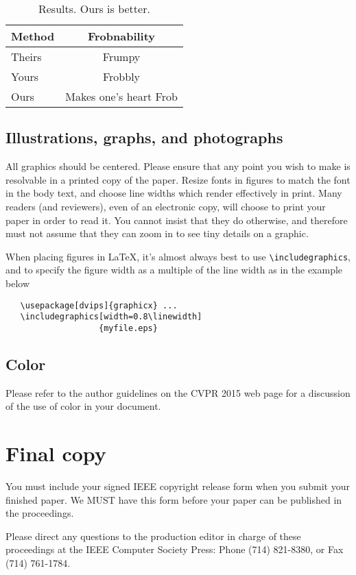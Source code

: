 \begin{table}
\begin{center}
\begin{tabular}{|l|c|}
\hline
Method & Frobnability \\
\hline\hline
Theirs & Frumpy \\
Yours & Frobbly \\
Ours & Makes one's heart Frob\\
\hline
\end{tabular}
\end{center}
\caption{Results.   Ours is better.}
\end{table}

\subsection{Illustrations, graphs, and photographs}

All graphics should be centered.  Please ensure that any point you wish to
make is resolvable in a printed copy of the paper.  Resize fonts in figures
to match the font in the body text, and choose line widths which render
effectively in print.  Many readers (and reviewers), even of an electronic
copy, will choose to print your paper in order to read it.  You cannot
insist that they do otherwise, and therefore must not assume that they can
zoom in to see tiny details on a graphic.

When placing figures in \LaTeX, it's almost always best to use
\verb+\includegraphics+, and to specify the  figure width as a multiple of
the line width as in the example below
{\small\begin{verbatim}
   \usepackage[dvips]{graphicx} ...
   \includegraphics[width=0.8\linewidth]
                   {myfile.eps}
\end{verbatim}
}


\subsection{Color}

Please refer to the author guidelines on the CVPR 2015 web page for a discussion
of the use of color in your document.

\section{Final copy}

You must include your signed IEEE copyright release form when you submit
your finished paper. We MUST have this form before your paper can be
published in the proceedings.

Please direct any questions to the production editor in charge of these
proceedings at the IEEE Computer Society Press: Phone (714) 821-8380, or
Fax (714) 761-1784.

